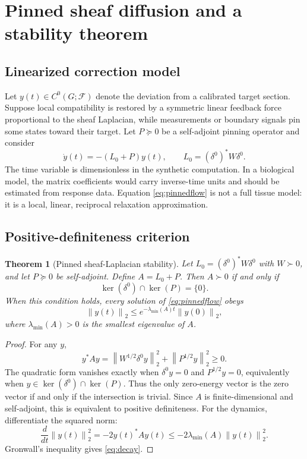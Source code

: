 \documentclass[12pt,a4paper]{article}
\newtheorem{theorem}[definition]{Theorem}
\newcommand{\norm}[1]{\left\lVert #1 \right\rVert}
\newcommand{\F}{\mathcal{F}}
\begin{document}
\section{Pinned sheaf diffusion and a stability theorem}
\subsection{Linearized correction model}
Let \(y(t)\in C^0(G;\F)\) denote the deviation from a calibrated target section. Suppose local compatibility is restored by a symmetric linear feedback force proportional to the sheaf Laplacian, while measurements or boundary signals pin some states toward their target. Let \(P\succeq0\) be a self-adjoint pinning operator and consider
\[
\dot y(t)=-(L_0+P)y(t),\qquad L_0=(\delta^0)^*W\delta^0.
\tag{13}\label{eq:pinnedflow}
\]
The time variable is dimensionless in the synthetic computation. In a biological model, the matrix coefficients would carry inverse-time units and should be estimated from response data. Equation \eqref{eq:pinnedflow} is not a full tissue model: it is a local, linear, reciprocal relaxation approximation.

\subsection{Positive-definiteness criterion}
\begin{theorem}[Pinned sheaf-Laplacian stability]
Let \(L_0=(\delta^0)^*W\delta^0\) with \(W\succ0\), and let \(P\succeq0\) be self-adjoint. Define \(A=L_0+P\). Then \(A\succ0\) if and only if
\[
\ker(\delta^0)\cap\ker(P)=\{0\}.
\tag{14}\label{eq:kernelcriterion}
\]
When this condition holds, every solution of \eqref{eq:pinnedflow} obeys
\[
\norm{y(t)}_2\leq e^{-\lambda_{\min}(A)t}\norm{y(0)}_2,
\tag{15}\label{eq:decay}
\]
where \(\lambda_{\min}(A)>0\) is the smallest eigenvalue of \(A\).
\end{theorem}
\begin{proof}
For any \(y\),
\[
y^*Ay=\norm{W^{1/2}\delta^0y}_2^2+\norm{P^{1/2}y}_2^2\geq0.
\]
The quadratic form vanishes exactly when \(\delta^0y=0\) and \(P^{1/2}y=0\), equivalently when \(y\in\ker(\delta^0)\cap\ker(P)\). Thus the only zero-energy vector is the zero vector if and only if the intersection is trivial. Since \(A\) is finite-dimensional and self-adjoint, this is equivalent to positive definiteness. For the dynamics, differentiate the squared norm:
\[
\frac{d}{dt}\norm{y(t)}_2^2=-2y(t)^*Ay(t)\leq-2\lambda_{\min}(A)\norm{y(t)}_2^2.
\]
Gronwall's inequality gives \eqref{eq:decay}.\end{proof}
\end{document}
